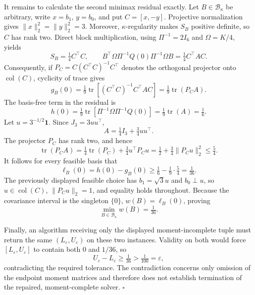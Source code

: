 It remains to calculate the second minimax residual exactly.  Let \(B\in\mathcal B_\kappa\) be arbitrary, write \(x=b_1\), \(y=b_0\), and put \(C=[x,-y]\).  Projective normalization gives \(\lVert x\rVert_2^2=\lVert y\rVert_2^2=3\).  Moreover, \(\kappa\)-regularity makes \(S_B\) positive definite, so \(C\) has rank two.  Direct block multiplication, using \(\Pi^{-1}=2I_6\) and \(\Omega=K/4\), yields
\[
S_B=\tfrac14 C^{\top}C,
\qquad
B^{\top}\Omega\Pi^{-1}Q(0)\Pi^{-1}\Omega B
=\tfrac14 C^{\top}AC.
\]
Consequently, if \(P_C=C(C^{\top}C)^{-1}C^{\top}\) denotes the orthogonal projector onto \(\operatorname{col}(C)\), cyclicity of trace gives
\[
g_B(0)
=\tfrac19\operatorname{tr}\!\left[(C^{\top}C)^{-1}C^{\top}AC\right]
=\tfrac19\operatorname{tr}(P_CA).
\]
The basis-free term in the residual is
\[
h(0)
=\tfrac19\operatorname{tr}\!\left[\Pi^{-1}\Omega\Pi^{-1}Q(0)\right]
=\tfrac19\operatorname{tr}(A)
=\tfrac16.
\]
Let \(u=3^{-1/2}\mathbf 1\).  Since \(J_3=3uu^{\top}\),
\[
A=\tfrac14 I_3+\tfrac34 uu^{\top}.
\]
The projector \(P_C\) has rank two, and hence
\[
\operatorname{tr}(P_CA)
=\tfrac14\operatorname{tr}(P_C)+\tfrac34u^{\top}P_Cu
=\tfrac12+\tfrac34\lVert P_Cu\rVert_2^2
\le\tfrac54.
\]
It follows for every feasible basis that
\[
\ell_B(0)=h(0)-g_B(0)
\ge \tfrac16-\tfrac19\cdot\tfrac54
=\tfrac1{36}.
\]
The previously displayed feasible choice has \(b_1=\sqrt3u\) and \(b_0\perp u\), so \(u\in\operatorname{col}(C)\), \(\lVert P_Cu\rVert_2=1\), and equality holds throughout.  Because the covariance interval is the singleton \(\{0\}\), \(w(B)=\ell_B(0)\), proving
\[
\min_{B\in\mathcal B_\kappa}w(B)=\tfrac1{36}.
\]

Finally, an algorithm receiving only the displayed moment-incomplete tuple must return the same \((L_{\varepsilon},U_{\varepsilon})\) on these two instances.  Validity on both would force \([L_{\varepsilon},U_{\varepsilon}]\) to contain both \(0\) and \(1/36\), so
\[
U_{\varepsilon}-L_{\varepsilon}\ge\tfrac1{36}>\tfrac1{100}=\varepsilon,
\]
contradicting the required tolerance.  The contradiction concerns only omission of the endpoint moment matrices and therefore does not establish termination of the repaired, moment-complete solver. \(\square\)